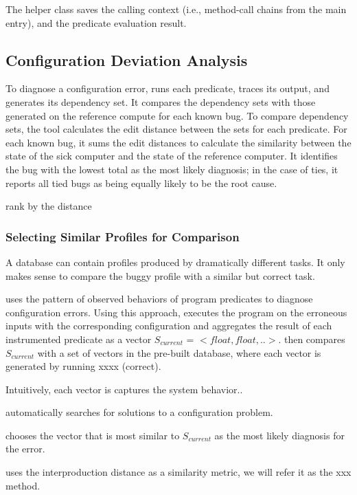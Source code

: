 The helper class  saves the calling context (i.e.,
method-call chains from the main entry), and the predicate evaluation result.


\subsection{Configuration Deviation Analysis}
\label{sec:analysis}

To diagnose a configuration error, \ourtool runs each predicate, traces its
output, and generates its dependency set. It compares the dependency sets
with those generated on the reference compute for each known bug. To compare
dependency sets, the tool calculates the edit distance between the sets
for each predicate. For each known bug, it sums the edit
distances to calculate the similarity between the state of the sick
computer and the state of the reference computer. It identifies the bug
with the lowest total as the most likely diagnosis; in the case of ties,
it reports all tied bugs as being equally likely to be the root cause.

rank by the distance



\subsubsection{Selecting Similar Profiles for Comparison}

A database can contain profiles produced by dramatically
different tasks. It only makes sense to compare the buggy profile
with a similar but correct task.

\ourtool uses the pattern of observed behaviors of program predicates
to diagnose configuration errors. Using this approach, \ourtool
executes the program on the erroneous inputs with the
corresponding configuration and aggregates the result of
each instrumented predicate as a vector $S_{current}$ = $<float, float, ..>$.
\ourtool then compares $S_{current}$ with a set of
vectors in the pre-built database, where each vector is generated
by running xxxx (correct).

Intuitively, each vector is captures the system behavior..

\ourtool automatically searches for solutions to a configuration
problem.

\ourtool chooses the vector that is most similar to $S_{current}$ as
the most likely diagnosis for the error.

\ourtool uses the interproduction distance as a similarity metric, we will
refer it as the xxx method.


